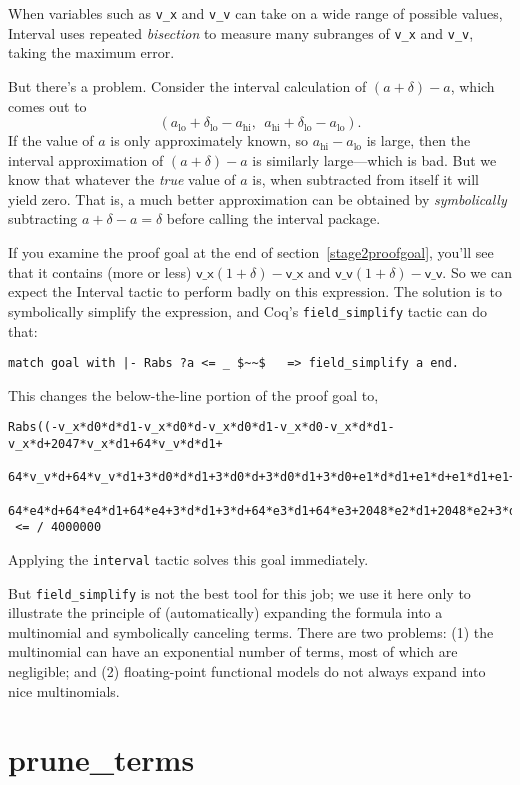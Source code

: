 \documentclass[article]{memoir}
\begin{document}
When variables such as \lstinline{v_x} and \lstinline{v_v} can
take on a wide range of possible values, Interval uses
repeated \emph{bisection} to measure many subranges
of \lstinline{v_x} and \lstinline{v_v}, taking the maximum error.

But there's a problem.  Consider the interval calculation of
$(a+\delta)-a$, which comes out to
\[(a_\mathrm{lo}+\delta_\mathrm{lo}-a_\mathrm{hi},~~a_\mathrm{hi}+\delta_\mathrm{lo}-a_\mathrm{lo}).\]
If the value of $a$ is only approximately known, so
$a_\mathrm{hi}-a_\mathrm{lo}$ is large, then the interval approximation
of $(a+\delta)-a$ is similarly large---which is bad.  But we know that whatever the \emph{true} value of $a$ is, when subtracted from itself it will yield zero.
That is, a much better approximation can be obtained by
\emph{symbolically} subtracting $a+\delta-a=\delta$
before calling the interval package.

If you examine the proof goal at the end of section~\ref{stage2proofgoal},
you'll see that it contains (more or less)
$\mathsf{v\_x}(1+\delta)-\mathsf{v\_x}$ and
$\mathsf{v\_v}(1+\delta)-\mathsf{v\_v}$.  So we can expect the Interval
tactic to perform badly on this expression.
The solution is to symbolically simplify the expression,
and Coq's \lstinline{field_simplify} tactic can do that:

\begin{lstlisting}
match goal with |- Rabs ?a <= _ $~~$   => field_simplify a end.
\end{lstlisting}
This changes the below-the-line portion of the proof goal to,
\begin{lstlisting}
Rabs((-v_x*d0*d*d1-v_x*d0*d-v_x*d0*d1-v_x*d0-v_x*d*d1-v_x*d+2047*v_x*d1+64*v_v*d*d1+
   64*v_v*d+64*v_v*d1+3*d0*d*d1+3*d0*d+3*d0*d1+3*d0+e1*d*d1+e1*d+e1*d1+e1+64*e4*d*d1+
   64*e4*d+64*e4*d1+64*e4+3*d*d1+3*d+64*e3*d1+64*e3+2048*e2*d1+2048*e2+3*d1+2048*e0)/2048)
 <= / 4000000
\end{lstlisting}
Applying the \lstinline{interval} tactic solves this goal immediately.

But \lstinline{field_simplify} is not the best tool for this job;
we use it here only to illustrate the principle of (automatically) expanding the
formula into a multinomial and symbolically canceling terms.
There are two problems: (1) the multinomial can have an exponential number of terms, most of which are negligible; and (2) floating-point functional models do not always expand into nice multinomials.

\chapter{prune\_terms}
\end{document}
